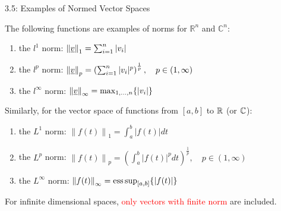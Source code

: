 \documentclass[10pt,english,aspectratio=169]{beamer}
\begin{document}
\begin{frame}{3.5: Examples of Normed Vector Spaces}

\begin{example}
The following functions are examples of norms for $\mathbb{R}^n$ and $\mathbb{C}^n$:
\begin{enumerate}
\item the $l^1$ norm: $\left\| \underline{v} \right\|_1 = \sum_{i=1}^n |v_i|$
\item the $l^p$ norm: $\left\| \underline{v} \right\|_p = \left( \sum_{i=1}^n |v_i|^p \right)^{\frac{1}{p}}, \quad p \in (1,\infty)$
\item the $l^{\infty}$ norm: $\left\| \underline{v} \right\|_{\infty} = \max_{1,\ldots, n} \{ |v_i| \}$
\end{enumerate}
\end{example}

\begin{example}
Similarly, for the vector space of functions from $[a, b]$ to $\mathbb{R}$ (or $\mathbb{C}$):
\begin{enumerate}
\item the $L^1$ norm: $\left\| f(t) \right\|_1 = \int_a^b |f(t)| dt$
\item the $L^p$ norm: $\left\| f(t) \right\|_p = \left( \int_a^b |f(t)|^p dt \right)^{\frac{1}{p}}, \quad p \in (1,\infty)$
\item the $L^{\infty}$ norm: $\left\| f(t) \right\|_{\infty} = \operatorname*{ess\,sup}_{[a,b]} \{ | f(t) | \}$
\end{enumerate}
\end{example}

For infinite dimensional spaces, \textcolor{red}{only vectors with finite norm} are included.

\end{frame}
\end{document}
